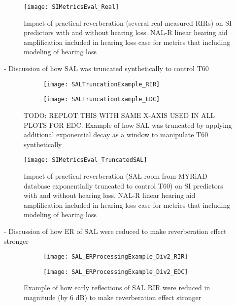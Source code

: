\begin{figure}[H]
	\texttt{[image: SIMetricsEval\_Real]}
	\centering
	\caption{Impact of practical reverberation (several real measured RIRs) on SI predictors with and without hearing loss. NAL-R linear hearing aid amplification included in hearing loss case for metrics that including modeling of hearing loss}
	\label{fig:SIMetricsEval_Real}
\end{figure}

- Discussion of how SAL was truncated synthetically to control T60

\begin{figure}[H]
	\centering
	\begin{subfigure}[b]{0.49\textwidth}
		\centering
		\texttt{[image: SALTruncationExample\_RIR]}
	\end{subfigure}
	\hfill
	\begin{subfigure}[b]{0.49\textwidth}
		\centering
		\texttt{[image: SALTruncationExample\_EDC]}
	\end{subfigure}
	\hfill
	\caption{TODO: REPLOT THIS WITH SAME X-AXIS USED IN ALL PLOTS FOR EDC. Example of how SAL was truncated by applying additional exponential decay as a window to manipulate T60 synthetically}
	\label{fig:SALTruncationExample}
\end{figure}

\begin{figure}[H]
	\texttt{[image: SIMetricsEval\_TruncatedSAL]}
	\centering
	\caption{Impact of practical reverberation (SAL room from MYRiAD database exponentially truncated to control T60) on SI predictors with and without hearing loss. NAL-R linear hearing aid amplification included in hearing loss case for metrics that including modeling of hearing loss}
	\label{fig:SIMetricsEval_TruncatedSAL}
\end{figure}

- Discussion of how ER of SAL were reduced to make reverberation effect stronger


\begin{figure}[H]
	\centering
	\begin{subfigure}[b]{0.49\textwidth}
		\centering
		\texttt{[image: SAL\_ERProcessingExample\_Div2\_RIR]}
	\end{subfigure}
	\hfill
	\begin{subfigure}[b]{0.49\textwidth}
		\centering
		\texttt{[image: SAL\_ERProcessingExample\_Div2\_EDC]}
	\end{subfigure}
	\caption{Example of how early reflections of SAL RIR were reduced in magnitude (by 6 dB) to make reverberation effect stronger}
	\label{fig:SAL_ERProcessing_Div2}
\end{figure}

